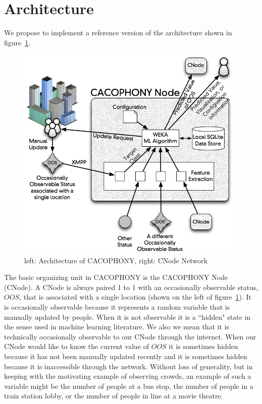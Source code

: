 \section{Architecture}

We propose
to implement a reference version of the architecture shown in
figure~\ref{fig:architecture}.

\begin{figure}
\begin{center}
    \includegraphics[width=\columnwidth, keepaspectratio=true]{images/architecture.png}
	\caption{\label{fig:architecture}left: Architecture of CACOPHONY, right: CNode Network}
\end{center}
\end{figure}


The basic organizing unit in CACOPHONY is the CACOPHONY Node (CNode).  A CNode
is always paired 1 to 1 with an occasionally observable status, $OOS$, that is associated with
a single location (shown on the left of figure~\ref{fig:architecture}).  It is
occasionally observable because it represents a random variable that is manually
updated by people.  When it is not observable it is a ``hidden" state in the
sense used in machine learning literature.  We also we mean that it is technically
occasionally observable to our CNode through the internet.  When our CNode would
like to know the current value of $OOS$ it is sometimes hidden because it has
not been manually updated recently and it is sometimes hidden because it is
inaccessible through the network.  Without loss of generality, but in keeping with the motivating example of
observing crowds, an example of such a variable might be the
number of people at a bus stop, the number of people in a train station lobby, or the
number of people in line at a movie theatre.

